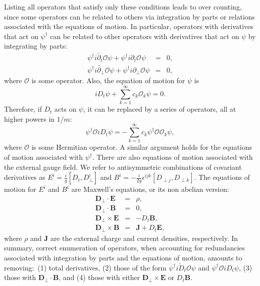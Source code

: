 \documentclass[prd,onecolumn, nofootinbib, 11pt]{revtex4}
\begin{document}
Listing all operators that satisfy only these conditions leads to over counting, since some operators can be related to others via integration by parts or relations associated with the equations of motion.  
In particular, operators with derivatives that act on $\psi^\dagger $ can be related to other operators with derivatives that act on $\psi$ by integrating by parts: 
%
\begin{eqnarray}
\psi^\dagger i\overleftarrow{\partial_t} \mathcal{O} \psi + \psi^\dagger i\partial_t \mathcal{O} \psi &=& 0 , \\
\psi^\dagger i\overleftarrow{\partial_\perp} \mathcal{O} \psi + \psi^\dagger i\partial_\perp \mathcal{O} \psi &=& 0 ,
\end{eqnarray}
%
where $\mathcal{O}$ is some operator.  
Also, the equation of motion for $\psi$ is
%
\begin{equation}
iD_t \psi + \displaystyle \sum_{k=1}^\infty   c_k  \mathcal{O}_k \psi = 0 .
\end{equation}
%
Therefore, if $D_t$ acts on $\psi$, it can be replaced by a series of operators, all at higher powers in $1/m$:
%
\begin{equation}
\psi^\dagger \mathcal{O} iD_t \psi = - \displaystyle \sum_{k=1}^\infty   c_k \psi^\dagger \mathcal{O} \mathcal{O}_k \psi ,
\end{equation}
%
where $\mathcal{O}$ is some Hermitian operator.  
A similar argument holds for the equations of motion associated with $\psi^\dagger$.  
%
There are also equations of motion associated with the external gauge field.  We refer to antisymmetric combinations of covariant derivatives as $E^i = \frac{i}{g}[D_t, D^i_\perp]$ and $B^i = -\frac{i}{2g} \epsilon^{ijk} [D_{\perp j}, D_{\perp k}]$.  The equations of motion for $E^i$ and $B^i$ are Maxwell's equations, or its non abelian version:
%
\begin{eqnarray}
\bm{D}_{\perp} \cdot \bm{E} &=& \rho ,  \\
\bm{D}_{\perp} \cdot \bm{B} &=& 0 , \\
\label{gaugeEOM}
\bm{D}_{\perp} \times \bm{E} &=& -D_{t} \bm{B} ,  \\
\bm{D}_{\perp} \times \bm{B} &=& \bm{J} + D_{t} \bm{E} ,
\end{eqnarray}
%
where $\rho$ and ${\bm J}$ are the external charge and current densities, respectively.  
In summary, correct enumeration of operators, when accounting for redundancies associated with integration by parts and the equations of motion,  amounts to removing:~(1) total derivatives, (2) those of the form $\psi^\dagger i\overleftarrow{D}_t \mathcal{O}\psi$ and $\psi^\dagger \mathcal{O} iD_t \psi$, (3) those with $\bm{D}_{\perp} \cdot \bm{B}$, and (4) those with either $\bm{D}_{\perp} \times \bm{E}$ or $D_{t} \bm{B}$.  
\end{document}
